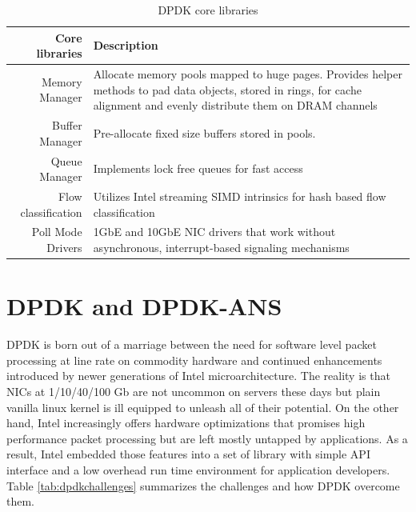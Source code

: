 \documentclass{sig-alternate-05-2015}
\begin{document}
\vspace*{-10pt}
\begin{table}[]
\centering
\caption{DPDK core libraries}
\label{tab:dpdkcorelibs}
\begin{tabular}{|r|p{2in}|}
\hline
Core libraries      & Description                                                                                                                                       \\ \hline
Memory Manager      & Allocate memory pools mapped to huge pages. Provides helper methods to pad data objects, stored in rings, for cache alignment and evenly distribute them on DRAM channels \\ \hline
Buffer Manager      & Pre-allocate fixed size buffers stored in pools.                                                                                                  \\ \hline
Queue Manager       & Implements lock free queues for fast access                                                                                                       \\ \hline
Flow classification & Utilizes Intel streaming SIMD intrinsics for hash based flow classification                                                                       \\ \hline
Poll Mode Drivers    & 1GbE and 10GbE NIC drivers that work without asynchronous, interrupt-based signaling mechanisms                                                   \\ \hline
\end{tabular}
\end{table}


\section{DPDK and DPDK-ANS}
DPDK is born out of a marriage between the need for software level packet processing at line rate on commodity hardware and continued enhancements introduced by newer generations of Intel microarchitecture. The reality is that NICs at 1/10/40/100 Gb are not uncommon on servers these days but plain vanilla linux kernel is ill equipped to unleash all of their potential. On the other hand, Intel increasingly offers hardware optimizations that promises high performance packet processing but are left mostly untapped by applications. As a result, Intel embedded those features into a set of library with simple API interface and a low overhead run time environment for application developers. Table \ref{tab:dpdkchallenges} summarizes the challenges and how DPDK overcome them. \cite{dpdk:presentation}
\end{document}
